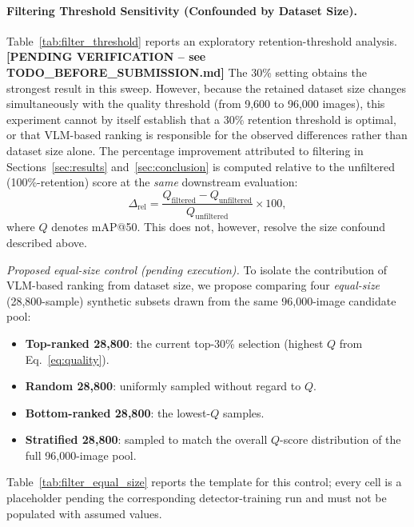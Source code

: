 \documentclass[journal]{IEEEtran}
\begin{document}
\FloatBarrier




\paragraph{Filtering Threshold Sensitivity (Confounded by Dataset Size).}
\label{sec:filtering_confound}
Table~\ref{tab:filter_threshold} reports an exploratory retention-threshold analysis. \textbf{[PENDING VERIFICATION -- see TODO\_BEFORE\_SUBMISSION.md]} The 30\% setting obtains the strongest result in this sweep. However, because the retained dataset size changes simultaneously with the quality threshold (from 9,600 to 96,000 images), this experiment cannot by itself establish that a 30\% retention threshold is optimal, or that VLM-based ranking is responsible for the observed differences rather than dataset size alone. The percentage improvement attributed to filtering in Sections~\ref{sec:results} and~\ref{sec:conclusion} is computed relative to the unfiltered (100\%-retention) score at the \emph{same} downstream evaluation:
\begin{equation}
\Delta_{\mathrm{rel}}
=
\frac{Q_{\mathrm{filtered}}-Q_{\mathrm{unfiltered}}}{Q_{\mathrm{unfiltered}}}\times100,
\label{eq:filtering_relative_improvement}
\end{equation}
where $Q$ denotes mAP@50. This does not, however, resolve the size confound described above.

\emph{Proposed equal-size control (pending execution).} To isolate the contribution of VLM-based ranking from dataset size, we propose comparing four \emph{equal-size} (28,800-sample) synthetic subsets drawn from the same 96,000-image candidate pool:
\begin{itemize}
    \item \textbf{Top-ranked 28,800}: the current top-30\% selection (highest $Q$ from Eq.~\eqref{eq:quality}).
    \item \textbf{Random 28,800}: uniformly sampled without regard to $Q$.
    \item \textbf{Bottom-ranked 28,800}: the lowest-$Q$ samples.
    \item \textbf{Stratified 28,800}: sampled to match the overall $Q$-score distribution of the full 96,000-image pool.
\end{itemize}
Table~\ref{tab:filter_equal_size} reports the template for this control; every cell is a placeholder pending the corresponding detector-training run and must not be populated with assumed values.
\end{document}
